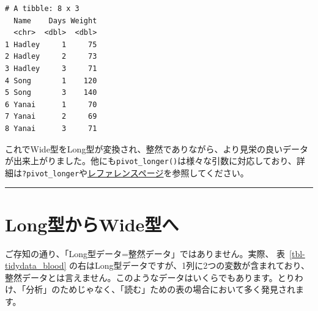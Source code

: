 \documentclass[
  a4paper,
  pandoc,
  ja=standard,
  jafont=haranoaji]{bxjsbook}
\begin{document}
\begin{verbatim}
# A tibble: 8 x 3
  Name    Days Weight
  <chr>  <dbl>  <dbl>
1 Hadley     1     75
2 Hadley     2     73
3 Hadley     3     71
4 Song       1    120
5 Song       3    140
6 Yanai      1     70
7 Yanai      2     69
8 Yanai      3     71
\end{verbatim}

これでWide型をLong型が変換され、整然でありながら、より見栄の良いデータが出来上がりました。他にも\texttt{pivot\_longer()}は様々な引数に対応しており、詳細は\texttt{?pivot\_longer}や\href{https://tidyr.tidyverse.org/reference/pivot_longer.html}{レファレンスページ}を参照してください。

\begin{center}\rule{0.5\linewidth}{0.5pt}\end{center}

\hypertarget{sec-tidydata_spread}{%
\section{Long型からWide型へ}\label{sec-tidydata_spread}}

ご存知の通り、「Long型データ=整然データ」ではありません。実際、
表~\ref{tbl-tidydata_blood}
の右はLong型データですが、1列に2つの変数が含まれており、整然データとは言えません。このようなデータはいくらでもあります。とりわけ、「分析」のためじゃなく、「読む」ための表の場合において多く発見されます。
\end{document}
